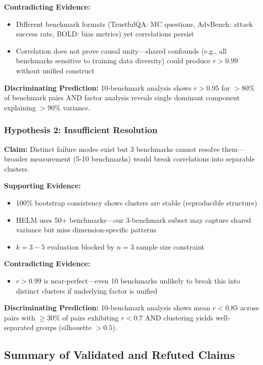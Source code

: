 \textbf{Contradicting Evidence:}
\begin{itemize}
\item Different benchmark formats (TrustfulQA: MC questions, AdvBench: attack success rate, BOLD: bias metrics) yet correlations persist
\item Correlation does not prove causal unity---shared confounds (e.g., all benchmarks sensitive to training data diversity) could produce $r > 0.99$ without unified construct
\end{itemize}

\textbf{Discriminating Prediction:} 10-benchmark analysis shows $r > 0.95$ for $>80\%$ of benchmark pairs AND factor analysis reveals single dominant component explaining $>90\%$ variance.

\subsubsection{Hypothesis 2: Insufficient Resolution}

\textbf{Claim:} Distinct failure modes exist but 3 benchmarks cannot resolve them---broader measurement (5-10 benchmarks) would break correlations into separable clusters.

\textbf{Supporting Evidence:}
\begin{itemize}
\item 100\% bootstrap consistency shows clusters are stable (reproducible structure)
\item HELM uses 50+ benchmarks---our 3-benchmark subset may capture shared variance but miss dimension-specific patterns
\item $k=3-5$ evaluation blocked by $n=3$ sample size constraint
\end{itemize}

\textbf{Contradicting Evidence:}
\begin{itemize}
\item $r > 0.99$ is near-perfect---even 10 benchmarks unlikely to break this into distinct clusters if underlying factor is unified
\end{itemize}

\textbf{Discriminating Prediction:} 10-benchmark analysis shows mean $r < 0.85$ across pairs with $\geq 30\%$ of pairs exhibiting $r < 0.7$ AND clustering yields well-separated groups (silhouette $> 0.5$).

\subsection{Summary of Validated and Refuted Claims}

